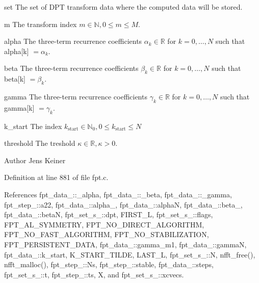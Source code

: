 \begin{DoxyItemize}
\item set The set of D\-P\-T transform data where the computed data will be stored. \item m The transform index $m \in \mathbb{N}, 0 \le m \le M$. \item alpha The three-\/term recurrence coefficients $\alpha_k \in \mathbb{R}$ for $k=0,\ldots,N$ such that {\ttfamily  alpha\mbox{[}k\mbox{]}} $=\alpha_k$. \item beta The three-\/term recurrence coefficients $\beta_k \in \mathbb{R}$ for $k=0,\ldots,N$ such that {\ttfamily  beta\mbox{[}k\mbox{]} } $=\beta_k$. \item gamma The three-\/term recurrence coefficients $\gamma_k \in \mathbb{R}$ for $k=0,\ldots,N$ such that {\ttfamily  gamma\mbox{[}k\mbox{]} } $=\gamma_k$. \item k\-\_\-start The index $k_{\text{start}} \in \mathbb{N}_0, 0 \le k_{\text{start}} \le N$ \item threshold The treshold $\kappa \in \mathbb{R}, \kappa > 0$.\end{DoxyItemize}
\begin{DoxyAuthor}{Author}
Jens Keiner 
\end{DoxyAuthor}


Definition at line 881 of file fpt.\-c.



References fpt\-\_\-data\-\_\-\-::\-\_\-alpha, fpt\-\_\-data\-\_\-\-::\-\_\-beta, fpt\-\_\-data\-\_\-\-::\-\_\-gamma, fpt\-\_\-step\-\_\-\-::a22, fpt\-\_\-data\-\_\-\-::alpha\-\_, fpt\-\_\-data\-\_\-\-::alpha\-N, fpt\-\_\-data\-\_\-\-::beta\-\_, fpt\-\_\-data\-\_\-\-::beta\-N, fpt\-\_\-set\-\_\-s\-\_\-\-::dpt, F\-I\-R\-S\-T\-\_\-\-L, fpt\-\_\-set\-\_\-s\-\_\-\-::flags, F\-P\-T\-\_\-\-A\-L\-\_\-\-S\-Y\-M\-M\-E\-T\-R\-Y, F\-P\-T\-\_\-\-N\-O\-\_\-\-D\-I\-R\-E\-C\-T\-\_\-\-A\-L\-G\-O\-R\-I\-T\-H\-M, F\-P\-T\-\_\-\-N\-O\-\_\-\-F\-A\-S\-T\-\_\-\-A\-L\-G\-O\-R\-I\-T\-H\-M, F\-P\-T\-\_\-\-N\-O\-\_\-\-S\-T\-A\-B\-I\-L\-I\-Z\-A\-T\-I\-O\-N, F\-P\-T\-\_\-\-P\-E\-R\-S\-I\-S\-T\-E\-N\-T\-\_\-\-D\-A\-T\-A, fpt\-\_\-data\-\_\-\-::gamma\-\_\-m1, fpt\-\_\-data\-\_\-\-::gamma\-N, fpt\-\_\-data\-\_\-\-::k\-\_\-start, K\-\_\-\-S\-T\-A\-R\-T\-\_\-\-T\-I\-L\-D\-E, L\-A\-S\-T\-\_\-\-L, fpt\-\_\-set\-\_\-s\-\_\-\-::\-N, nfft\-\_\-free(), nfft\-\_\-malloc(), fpt\-\_\-step\-\_\-\-::\-Ns, fpt\-\_\-step\-\_\-\-::stable, fpt\-\_\-data\-\_\-\-::steps, fpt\-\_\-set\-\_\-s\-\_\-\-::t, fpt\-\_\-step\-\_\-\-::ts, X, and fpt\-\_\-set\-\_\-s\-\_\-\-::xcvecs.



